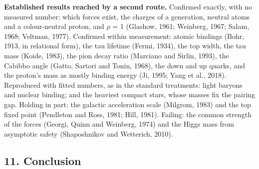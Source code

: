 \documentclass[
  11pt,
]{article}
\begin{document}
\textbf{Established results reached by a second route.} Confirmed exactly, with no measured number: which forces exist, the charges of a generation, neutral atoms and a colour-neutral proton, and \ensuremath{\rho} = 1 (Glashow, 1961; Weinberg, 1967; Salam, 1968; Veltman, 1977). Confirmed within measurement: atomic bindings (Bohr, 1913, in relational form), the tau lifetime (Fermi, 1934), the top width, the tau mass (Koide, 1983), the pion decay ratio (Marciano and Sirlin, 1993), the Cabibbo angle (Gatto, Sartori and Tonin, 1968), the down and up quarks, and the proton's mass as mostly binding energy (Ji, 1995; Yang et al., 2018). Reproduced with fitted numbers, as in the standard treatments: light baryons and nuclear binding; and the heaviest compact stars, whose masses fix the pairing gap. Holding in part: the galactic acceleration scale (Milgrom, 1983) and the top fixed point (Pendleton and Ross, 1981; Hill, 1981). Failing: the common strength of the forces (Georgi, Quinn and Weinberg, 1974) and the Higgs mass from asymptotic safety (Shaposhnikov and Wetterich, 2010).

\hypertarget{conclusion}{%
\subsection{11. Conclusion}\label{conclusion}}
\end{document}
